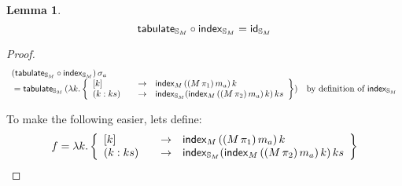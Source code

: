 \documentclass{article}
\newtheorem{lemma}[definition]{Lemma}
\begin{document}
\begin{lemma}
$$
\mathsf{tabulate}_{\mathbb{S}_{M}} \circ \mathsf{index}_{\mathbb{S}_{M}} = \mathsf{id}_{\mathbb{S}_{M}}
$$
\end{lemma}
\begin{proof}

$$
\begin{array}{l l}
(\tabulatef_{\stream{M}} \circ \indexf_{\stream{M}})\, \sigma_a \\
{}= \tabulatef_{\stream{M}}\, (\lambda k . 
\left\{
\begin{array}{l@{\qquad}l l}
[k] &\to& \indexf_M\, ((M\,\pi_1)\,m_a)\, k\\
(k : ks) &\to& \indexf_{\stream{M}} (\indexf_M\, ((M\,\pi_2)\,m_a)\, k)\, ks
\end{array}
\right\}) &  \mbox{by definition of }\indexf_{\stream{M}} 
\end{array}
$$

To make the following easier, lets define:
$$
\begin{array}{l}
f = \lambda k . 
\left\{
\begin{array}{l@{\qquad}l l}
[k] &\to& \indexf_M\, ((M\,\pi_1)\,m_a)\, k\\
(k : ks) &\to& \indexf_{\stream{M}} (\indexf_M\, ((M\,\pi_2)\,m_a)\, k)\, ks
\end{array}
\right\}
\end{array}
$$


\end{proof}
\end{document}
